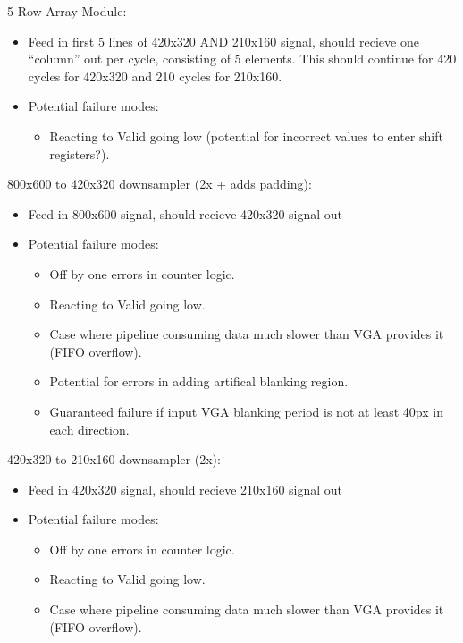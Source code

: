 \documentclass[11pt]{article}
\begin{document}
5 Row Array Module:
\begin{itemize}
    \item Feed in first 5 lines of 420x320 AND 210x160 signal, should recieve one ``column'' out per cycle, consisting of 5 elements. This should continue for 420 cycles for 420x320 and 210 cycles for 210x160.
    \item Potential failure modes:
        \begin{itemize}
            \item Reacting to Valid going low (potential for incorrect values to enter shift registers?).
        \end{itemize}
\end{itemize}


800x600 to 420x320 downsampler (2x + adds padding):
\begin{itemize}
    \item Feed in 800x600 signal, should recieve 420x320 signal out
    \item Potential failure modes:
        \begin{itemize}
            \item Off by one errors in counter logic.
            \item Reacting to Valid going low.
            \item Case where pipeline consuming data much slower than VGA provides it (FIFO overflow).
            \item Potential for errors in adding artifical blanking region.
            \item Guaranteed failure if input VGA blanking period is not at least 40px in each direction.
        \end{itemize}
\end{itemize}


420x320 to 210x160 downsampler (2x):
\begin{itemize}
    \item Feed in 420x320 signal, should recieve 210x160 signal out
    \item Potential failure modes:
        \begin{itemize}
            \item Off by one errors in counter logic.
            \item Reacting to Valid going low.
            \item Case where pipeline consuming data much slower than VGA provides it (FIFO overflow).
        \end{itemize}
\end{itemize}
\end{document}
